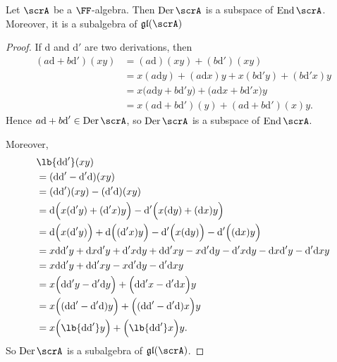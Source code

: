 \documentclass{article}
\DeclarePairedDelimiter\lb\lbrack\rbrack
\DeclareMathOperator{\End}{End}
\DeclareMathOperator{\Der}{Der}
\newcommand{\dd}{\ensuremath{\text{d}}}
\newcommand*\gl{\ensuremath{\mathfrak{gl}}}
\begin{document}
\begin{proposition}
    Let $\scrA$ be a $\FF$-algebra.
    Then $\Der \scrA$ is a subspace of $\End \scrA$.
    Moreover, it is a subalgebra of $\gl(\scrA)$
\end{proposition}

\begin{proof}
    If $\dd$ and $\dd'$ are two derivations, then
    \begin{align*}
        (a\dd + b\dd')(xy)
        &=
        (a\dd)(xy) + (b\dd')(xy)
        \\
        &=
        x(a\dd y) + (a\dd x)y
        +
        x(b\dd'y) + (b\dd'x)y
        \\
        &=
        x
        \Big(
            a\dd y + b\dd'y
        \Big)
        +
        \Big(
            a\dd x + b\dd'x
        \Big)
        y
        \\
        &=
        x(a\dd + b\dd')(y)
        +
        (a\dd + b\dd')(x)y.
    \end{align*}
    Hence $a\dd + b\dd' \in \Der \scrA$, so $\Der \scrA$ is a subspace of $\End \scrA$.

    Moreover, 
    \begin{align*}
        &\lb{\dd\dd'}(xy)
        \\
        &=
        (\dd\dd' - \dd'\dd)(xy)
        \\
        &=
        (\dd\dd')(xy) - (\dd'\dd)(xy)
        \\
        &=
        \dd
        \Big(
            x(\dd'y) + (\dd'x)y
        \Big)
        -
        \dd'
        \Big(
            x(\dd y) + (\dd x)y
        \Big)
        \\
        &=
        \dd\Big(x(\dd'y)\Big) 
        +
        \dd\Big((\dd'x)y\Big) 
        -
        \dd'\Big(x(\dd y)\Big) 
        -
        \dd'\Big((\dd x)y\Big) 
        \\
        &=
        x\dd\dd'y
        +
        \dd x \dd' y
        +
        \dd'x \dd y
        +
        \dd\dd'x y
        -
        x\dd'\dd y
        -
        \dd' x \dd y
        -
        \dd x \dd' y
        -
        \dd' \dd x y
        \\
        &=
        x\dd\dd'y
        +
        \dd\dd'x y
        -
        x\dd'\dd y
        -
        \dd' \dd x y
        \\
        &=
        x
        \Big(
            \dd\dd'y - \dd'\dd y
        \Big)
        +
        \Big(
            \dd\dd'x - \dd'\dd x 
        \Big)
        y
        \\
        &=
        x\Big((\dd\dd' - \dd'\dd)y\Big)
        +
        \Big((\dd\dd' - \dd'\dd)x\Big)y
        \\
        &=
        x\Big(\lb{\dd\dd'}y\Big)
        +
        \Big(\lb{\dd\dd'}x\Big)y.
    \end{align*}
    So $\Der \scrA$ is a subalgebra of $\gl(\scrA)$.
\end{proof}
\end{document}
